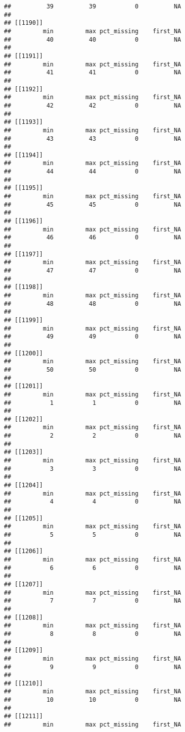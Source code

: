 \documentclass[
]{article}
\begin{document}
\begin{verbatim}
##          39          39           0          NA 
## 
## [[1190]]
##         min         max pct_missing    first_NA 
##          40          40           0          NA 
## 
## [[1191]]
##         min         max pct_missing    first_NA 
##          41          41           0          NA 
## 
## [[1192]]
##         min         max pct_missing    first_NA 
##          42          42           0          NA 
## 
## [[1193]]
##         min         max pct_missing    first_NA 
##          43          43           0          NA 
## 
## [[1194]]
##         min         max pct_missing    first_NA 
##          44          44           0          NA 
## 
## [[1195]]
##         min         max pct_missing    first_NA 
##          45          45           0          NA 
## 
## [[1196]]
##         min         max pct_missing    first_NA 
##          46          46           0          NA 
## 
## [[1197]]
##         min         max pct_missing    first_NA 
##          47          47           0          NA 
## 
## [[1198]]
##         min         max pct_missing    first_NA 
##          48          48           0          NA 
## 
## [[1199]]
##         min         max pct_missing    first_NA 
##          49          49           0          NA 
## 
## [[1200]]
##         min         max pct_missing    first_NA 
##          50          50           0          NA 
## 
## [[1201]]
##         min         max pct_missing    first_NA 
##           1           1           0          NA 
## 
## [[1202]]
##         min         max pct_missing    first_NA 
##           2           2           0          NA 
## 
## [[1203]]
##         min         max pct_missing    first_NA 
##           3           3           0          NA 
## 
## [[1204]]
##         min         max pct_missing    first_NA 
##           4           4           0          NA 
## 
## [[1205]]
##         min         max pct_missing    first_NA 
##           5           5           0          NA 
## 
## [[1206]]
##         min         max pct_missing    first_NA 
##           6           6           0          NA 
## 
## [[1207]]
##         min         max pct_missing    first_NA 
##           7           7           0          NA 
## 
## [[1208]]
##         min         max pct_missing    first_NA 
##           8           8           0          NA 
## 
## [[1209]]
##         min         max pct_missing    first_NA 
##           9           9           0          NA 
## 
## [[1210]]
##         min         max pct_missing    first_NA 
##          10          10           0          NA 
## 
## [[1211]]
##         min         max pct_missing    first_NA 

\end{verbatim}
\end{document}
